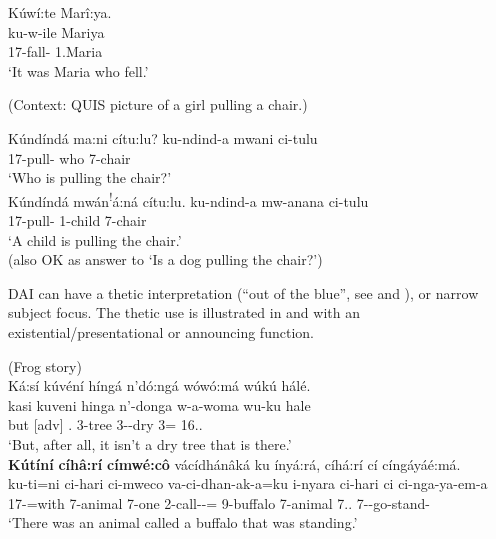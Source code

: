 \documentclass[output=paper]{langscibook}
\begin{document}
\ex
Kúwí:te Marî:ya.\\
\gll
ku-w-ile  Mariya\\
17\SM{}-fall-\PFV{}  1.Maria\\
\glt
‘It was Maria who fell.’\\

\z
\z

\ea\label{bkm:Ref127259279}(Context: QUIS picture of a girl pulling a chair.)

\ea
\label{bkm:Ref127259279:a}
Kúndíndá ma:ni cítu:lu? \jambox*{[VSO]}
\gll
ku-ndind-a  mwani  ci-tulu\\
17\SM{}-pull-\FV{}  who  7-chair\\
\glt
‘Who is pulling the chair?’\\


\ex
\label{bkm:Ref127259279:b}
Kúndíndá mwán\textsuperscript{!}á:ná cítu:lu. \jambox*{[VSO]}
\gll
ku-ndind-a  mw-anana  ci-tulu\\
17\SM{}-pull-\FV{}  1-child  7-chair\\
\glt
‘A child is pulling the chair.’\\
(also OK as answer to ‘Is a dog pulling the chair?’)


\z
\z

DAI can have a thetic interpretation (“out of the blue”, see \citealt{chapters/intro} and \citealt{Sasse1996,Sasse2006}), or narrow subject focus. The thetic use is illustrated in  and  with an existential/presentational or announcing function.

\ea
\label{bkm:Ref121990638}
(Frog story)\\
Ká:sí kúvéní híngá n’dó:ngá wówó:má wúkú hálé. \\
\gll
kasi  kuveni  hinga  n’-donga  w-a-woma  wu-ku  hale\\
but  [adv]  \COP.\NEG{}  3-tree  3-\CONN{}-dry  3\SM=\REL{}  16.\DEM.\MED{} \\
\glt
‘But, after all, it isn’t a dry tree that is there.’\\

\sn
\textbf{Kútíní} \textbf{cíhâ:rí} \textbf{címwé:cô} vácídhánâká ku ínyá:rá, cíhá:rí cí cíngáyáé:má. \\
\gll
ku-ti=ni  ci-hari  ci-mweco  va-ci-dhan-ak-a=ku  i-nyara  ci-hari ci  ci-nga-ya-em-a\\
17\SM{}-\IPFV{}=with  7-animal  7\SM{}-one  2\OM{}-call-\DUR{}-\FV{}=\REL{}  9-buffalo  7\SM{}-animal  7.\DEM.\PROX{}  7\SM{}-\REL{}-go-stand-\FV{} \\
\glt
‘There was an animal called a buffalo that was standing.’
\end{document}
